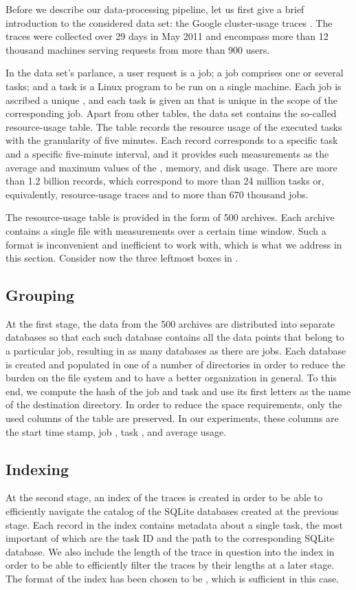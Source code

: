 Before we describe our data-processing pipeline, let us first give a brief
introduction to the considered data set: the Google cluster-usage traces
\cite{reiss2011}. The traces were collected over 29 days in May 2011 and
encompass more than 12 thousand machines serving requests from more than 900
users.

In the data set's parlance, a user request is a job; a job comprises one or
several tasks; and a task is a Linux program to be run on a single machine.
Each job is ascribed a unique , and each task is given an  that is
unique in the scope of the corresponding job. Apart from other tables, the data
set contains the so-called resource-usage table. The table records the resource
usage of the executed tasks with the granularity of five minutes. Each record
corresponds to a specific task and a specific five-minute interval, and it
provides such measurements as the average and maximum values of the ,
memory, and disk usage. There are more than 1.2 billion records, which
correspond to more than 24 million tasks or, equivalently, resource-usage traces
and to more than 670 thousand jobs.

The resource-usage table is provided in the form of 500 archives. Each archive
contains a single  file with measurements over a certain time window.
Such a format is inconvenient and inefficient to work with, which is what we
address in this section. Consider now the three leftmost boxes in
.

\subsection{Grouping} 
At the first stage, the  data from the 500 archives are distributed into
separate  databases so that each such database contains all the data
points that belong to a particular job, resulting in as many databases as there
are jobs. Each  database is created and populated in one of a number
of directories in order to reduce the burden on the file system and to have a
better organization in general. To this end, we compute the  hash of the
job  and task  and use its first letters as the name of the
destination directory. In order to reduce the space requirements, only the used
columns of the table are preserved. In our experiments, these columns are the
start time stamp, job , task , and average  usage.

\subsection{Indexing} 
At the second stage, an index of the traces is created in order to be able to
efficiently navigate the catalog of the SQLite databases created at the previous
stage. Each record in the index contains metadata about a single task, the most
important of which are the task ID and the path to the corresponding SQLite
database. We also include the length of the trace in question into the index in
order to be able to efficiently filter the traces by their lengths at a later
stage. The format of the index has been chosen to be , which is
sufficient in this case.

